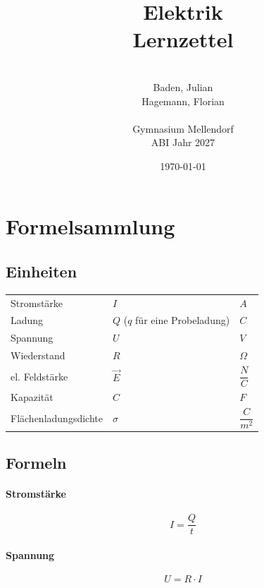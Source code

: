 \documentclass[a4paper]{article}
\title{\Huge{Elektrik\\Lernzettel}}
\date{\today}
\author{\quad\\Baden, Julian\\Hagemann, Florian\\\quad\\Gymnasium Mellendorf\\ABI Jahr 2027}
\begin{document}
\maketitle
\thispagestyle{empty}
\newpage
\tableofcontents \thispagestyle{empty}
\newpage
{}


\section{Formelsammlung}
\subsection{Einheiten}

\begin{center}
    \begin{tabular}{ p{4cm} p{4cm} p{4cm} }
         Stromstärke            & $I$           & $A$                 \\[0,5cm]
         Ladung                 & $Q$ ($q$ für eine Probeladung)  & $C$ \\[0,5cm]
         Spannung               & $U$           & $V$                 \\[0,5cm]
         Wiederstand            & $R$           & $\Omega$            \\[0,5cm]
         el. Feldstärke         & $\vec{E}$     & $\dfrac{N}{C}$      \\[0,5cm]
         Kapazität              & $C$           & $F$                 \\[0,5cm]
         Flächenladungsdichte   & $\sigma$      & $\dfrac{C}{m^2}$    \\[1cm]
    \end{tabular}
\end{center}


\subsection{Formeln}
\paragraph{Stromstärke}
\large{$$I = \dfrac{Q}{t}$$}

\paragraph{Spannung}
\large{$$U = R \cdot I$$}
\end{document}
